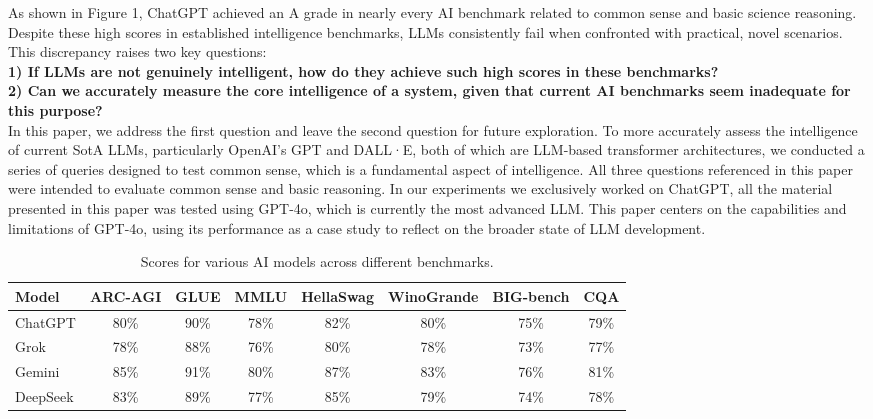 \documentclass[11pt]{scrartcl}
\begin{document}
As shown in Figure 1, ChatGPT achieved an A grade in nearly every AI benchmark related to common sense and basic science reasoning. Despite these high scores in established intelligence benchmarks, LLMs consistently fail when confronted with practical, novel scenarios. This discrepancy raises two key questions: \\
\textbf{1) If LLMs are not genuinely intelligent, how do they achieve such high scores in these benchmarks?} \\
\textbf{ 2) Can we accurately measure the core intelligence of a system, given that current AI benchmarks seem inadequate for this purpose?} \\
In this paper, we address the first question and leave the second question for future exploration.
To more accurately assess the intelligence of current SotA LLMs, particularly OpenAI's GPT and DALL·E, both of which are LLM-based transformer architectures, we conducted a series of queries designed to test common sense, which is a fundamental aspect of intelligence. All three questions referenced in this paper were intended to evaluate common sense and basic reasoning. In our experiments we exclusively worked on ChatGPT, all the material presented in this paper was tested using GPT-4o, which is currently the most advanced LLM. This paper centers on the capabilities and limitations of GPT-4o, using its performance as a case study to reflect on the broader state of LLM development. \\

\begin{table}[h]
\centering
\begin{tabular}{lccccccc}
\hline
Model     & ARC-AGI & GLUE & MMLU & HellaSwag & WinoGrande & BIG-bench & CQA \\
\hline
ChatGPT   & 80\%    & 90\% & 78\% & 82\%      & 80\%       & 75\%     & 79\%         \\
Grok      & 78\%    & 88\% & 76\% & 80\%      & 78\%       & 73\%     & 77\%         \\
Gemini    & 85\%    & 91\% & 80\% & 87\%      & 83\%       & 76\%     & 81\%         \\
DeepSeek  & 83\%    & 89\% & 77\% & 85\%      & 79\%       & 74\%     & 78\%         \\
\hline
\end{tabular}
\caption{Scores for various AI models across different benchmarks.}
\label{tab:benchmark_scores}
\end{table}
\end{document}
